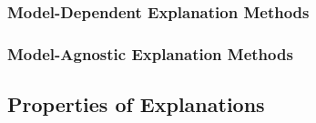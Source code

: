 \documentclass[english]{tktltiki2}
\theoremstyle{definition}
\theoremstyle{remark}
\begin{document}
\subsubsection{Model-Dependent Explanation Methods} %

\subsubsection{Model-Agnostic Explanation Methods} %

\subsection{Properties of Explanations} %
\end{document}
